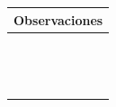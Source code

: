\documentclass[oneside,10pt]{book}
\begin{document}
\begin{tabularx}{\textwidth}{ X }
\multicolumn{1}{X}{\cellcolor[HTML]{9B9B9B}\textbf{Observaciones}} \\ \hline
\multicolumn{1}{|l|}{ }	\\
\multicolumn{1}{|l|}{ }	\\
\multicolumn{1}{|l|}{ }	\\
\multicolumn{1}{|l|}{ }	\\
\multicolumn{1}{|l|}{ }	\\
\multicolumn{1}{|l|}{ }	\\
\multicolumn{1}{|l|}{ }	\\
\multicolumn{1}{|l|}{ }	\\
\multicolumn{1}{|l|}{ }	\\
\multicolumn{1}{|l|}{ }	\\
\multicolumn{1}{|l|}{ }	\\
\multicolumn{1}{|l|}{ }	\\
\multicolumn{1}{|l|}{ }	\\
\multicolumn{1}{|l|}{ }	\\ \hline
\end{tabularx}
\end{document}
